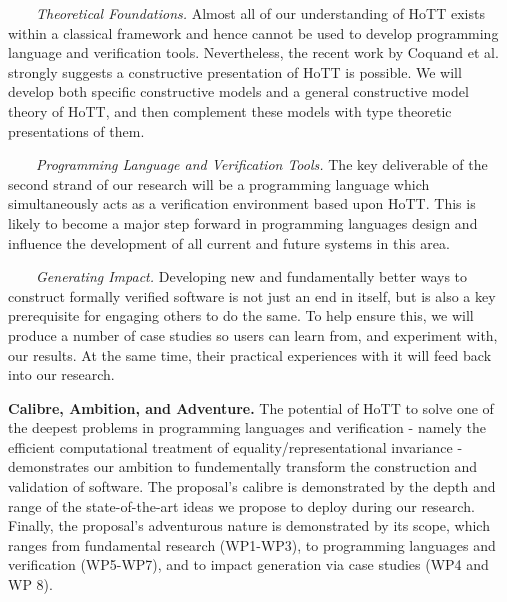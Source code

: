 \documentclass[a4paper,11pt]{article}
\begin{document}



$\;\;\; \;\;\;$ {\em Theoretical Foundations.} Almost all of our understanding
  of HoTT exists within a classical framework and hence cannot be used
  to develop programming language and verification tools. Nevertheless, the recent
  work by Coquand et al. strongly suggests a constructive presentation of HoTT
  is possible. We will develop both specific constructive models
  and a general constructive model theory of HoTT, and then complement
  these models with type theoretic presentations of them.

$\;\;\;\;\;\;$ {\em Programming Language and Verification Tools.} The key
  deliverable of the second strand of our research will be a
  programming language which simultaneously acts as a verification
  environment based upon HoTT. This is likely to become a major
  step forward in programming languages design and influence
  the development of all current and future systems in this area.

$\;\;\;\;\;\;$ {\em Generating Impact.} Developing new and fundamentally
  better ways to construct formally verified software is not just an
  end in itself, but is also a key prerequisite for engaging others to
  do the same.  To help ensure this, we will produce a number of case studies so
  users can learn from, and experiment with, our results. At the same time, their
  practical experiences with it will feed back into our research.

  {\bf Calibre, Ambition, and Adventure.} The potential of HoTT to
  solve one of the deepest problems in programming languages and
  verification - namely the efficient computational treatment of
  equality/representational invariance - demonstrates our ambition to
  fundementally transform the construction and validation of software.
  The proposal's calibre is demonstrated by the depth and range
  of the state-of-the-art ideas we propose to deploy during our
  research. Finally, the proposal's adventurous nature 
  is demonstrated by its scope, which ranges from fundamental research
  (WP1-WP3), to programming languages and verification (WP5-WP7), and
  to impact generation via case studies (WP4 and WP 8).
\end{document}
